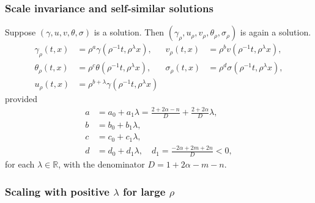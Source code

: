 \documentclass{beamer}
\begin{document}
\begin{frame}
 \frametitle{Scale invariance and self-similar solutions}
 Suppose $(\gamma,u,v,\theta,\sigma)$ is a solution. Then $(\gamma_\rho,u_\rho,v_\rho,\theta_\rho,\sigma_\rho)$ is again a solution.
\begin{equation}\label{eq:scale}
\begin{aligned}
 \gamma_\rho(t,x) &= \rho^a\gamma(\rho^{-1}t,\rho^\lambda x), &
 v_\rho(t,x) &= \rho^bv(\rho^{-1}t,\rho^\lambda x),\\
 \theta_\rho(t,x) &= \rho^c\theta(\rho^{-1}t,\rho^\lambda x), &
 \sigma_\rho(t,x) &= \rho^d\sigma(\rho^{-1}t,\rho^\lambda x),\\
 u_\rho(t,x) &= \rho^{b+\lambda}\gamma(\rho^{-1}t,\rho^\lambda x)
\end{aligned}
\end{equation}
provided{\scriptsize
\begin{equation} \label{eq:exponents}
\begin{aligned}
 a&= a_0 + a_1 \lambda=\frac{2+2\alpha-n}{D} + \frac{2+2\alpha}{D}\lambda, \\ b&=b_0 + b_1\lambda,\\%
 c&=c_0 + c_1\lambda,\\%
 d&=d_0 + d_1\lambda, \quad d_1 = \frac{-2\alpha+2m+2n}{D}<0,%
\end{aligned}
\end{equation}}
for each $\lambda \in \mathbb{R}$, with the denominator $D = 1+2\alpha-m-n$.
\end{frame}

\begin{frame}
 \frametitle{Scaling with positive $\lambda$ for large $\rho$}%
   \setcounter{subfigure}{0}
   \begin{figure}
	\quad \quad
  \end{figure}
\end{frame}
\end{document}
